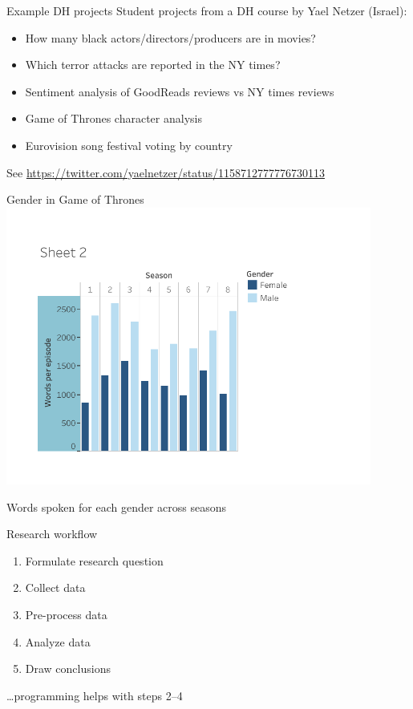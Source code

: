 \documentclass{beamer}
\begin{document}
\begin{frame}{Example DH projects}
	Student projects from a DH course by Yael Netzer (Israel):
	\begin{itemize}
		\item How many black actors/directors/producers are in movies?
		\item Which terror attacks are reported in the NY times?
		\item Sentiment analysis of GoodReads reviews vs NY times reviews
		\item Game of Thrones character analysis
		\item Eurovision song festival voting by country
	\end{itemize}

	See \url{https://twitter.com/yaelnetzer/status/1158712777776730113}
\end{frame}

\begin{frame}{Gender in Game of Thrones}\centering
	\includegraphics[width=0.9\textwidth]{fig/got}

    Words spoken for each gender across seasons
\end{frame}

\begin{frame}{Research workflow}
	\begin{enumerate}
		\item Formulate research question
		\item Collect data
		\item Pre-process data
		\item Analyze data
		\item Draw conclusions
	\end{enumerate}

	\pause
	\dots programming helps with steps 2--4
\end{frame}
\end{document}

